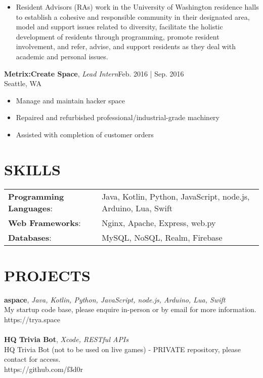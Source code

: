 \documentclass[line,margin]{res}
\begin{document}
\begin{resume}
\begin{itemize}
	\item Resident Advisors (RAs) work in the University of Washington residence halls to establish a cohesive and responsible community in their designated area, model and support issues related to diversity, facilitate the holistic development of residents through programming, promote resident involvement, and refer, advise, and support residents as they deal with academic and personal issues.
	\end{itemize}
	\textbf{Metrix:Create Space}, {\sl Lead Intern}\hfill Feb. 2016 | Sep. 2016\\Seattle, WA\\\begin{itemize} \itemsep 3pt
	\item Manage and maintain hacker space
	\item Repaired and refurbished professional/industrial-grade machinery
	\item Assisted with completion of customer orders
	\end{itemize}
	\section{SKILLS}
	\begin{tabular}{@{}ll}
		\textbf{Programming Languages}: & Java, Kotlin, Python, JavaScript, node.js, Arduino, Lua, Swift \\
		\textbf{Web Frameworks}:        & Nginx, Apache, Express, web.py                                 \\
		\textbf{Databases}:             & MySQL, NoSQL, Realm, Firebase                                  \\
	\end{tabular}
	\section{PROJECTS}
	\textbf{aspace}, {\sl Java, Kotlin, Python, JavaScript, node.js, Arduino, Lua, Swift}\\ My startup code base, please enquire in-person or by email for more information.\\ https://trya.space\\\\
	\textbf{HQ Trivia Bot}, {\sl Xcode, RESTful APIs}\\ HQ Trivia Bot (not to be used on live games) - PRIVATE repository, please contact for access.\\ https://github.com/f3d0r\\\\

\end{resume}
\end{document}
